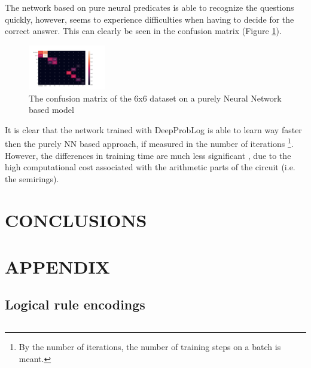 \documentclass[english]{sobraep}
\begin{document}
The network based on pure neural predicates is able to recognize the questions quickly, however, seems to experience difficulties when having to decide for the correct answer. This can clearly be seen in the confusion matrix (Figure \ref{fig:confusion_matrix_6x6_pure_NN}). %

\begin{figure}[htp]
    \begin{center}
    \includegraphics[width=0.3\textwidth]{confusion_matrix_pure_NN_6x6_clear_mistakes.png} 
    \captionsetup{justification=centering}
    \caption{The confusion matrix of the 6x6 dataset on a purely Neural Network based model}
    \label{fig:confusion_matrix_6x6_pure_NN}
    \end{center}
\end{figure}


It is clear that the network trained with DeepProbLog is able to learn way faster then the purely NN based approach, if measured in the number of iterations \footnote{By the number of iterations, the number of training steps on a batch is meant.}. However, the differences in training time are much less significant%
, due to the high computational cost associated with the arithmetic parts of the circuit (i.e. the semirings).

\section{CONCLUSIONS}
\label{sec:conclusions}

\section{APPENDIX}
\subsection{Logical rule encodings}
\label{appendix:logical_rule_encodings}
\inputminted[breaklines]{prolog}{"/home/jorrit/Data/KU Leuven/Semester 12/Capita Selecta H05N0a/deepproblog/src/deepproblog/examples/SORTOFCLEVR/model.pl"}



 

\end{document}
